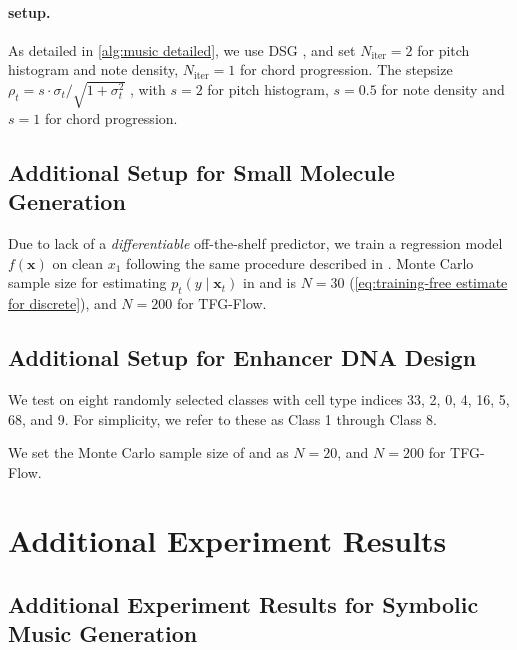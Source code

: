 \paragraph{\xcleansampling setup.}
As detailed in \cref{alg:music detailed}, we  use DSG \cite{yang2024guidance}, and set $N_{\text{iter}} = 2$ for pitch histogram and note density, $N_{\text{iter}} = 1$ for chord progression. The stepsize $\rho_t = s \cdot \sigma_t / \sqrt{1+\sigma_t^2} $ \citep{song2023loss,ye2024tfg}, with $s = 2$ for pitch histogram, $s=0.5$ for note density and $s=1$ for chord progression.




















\subsection{Additional Setup for Small Molecule Generation}\label{app:molecule setup}
Due to lack of a \textit{differentiable} off-the-shelf predictor, we train a regression model $f(\boldsymbol{x})$ on clean $x_1$ following the same procedure described in \citet{nisonoff2024unlocking}. Monte Carlo sample size for estimating $p_t(y\mid \boldsymbol{x}_t)$ in \xtgrad and \xtsampling is $N=30$ (\cref{eq:training-free estimate for discrete}), and $N=200$ for TFG-Flow.


\subsection{Additional Setup for Enhancer DNA Design}
We test on eight randomly selected classes with cell type indices 33, 2, 0, 4, 16, 5, 68, and 9. For simplicity, we refer to these as Class 1 through Class 8.


We set the Monte Carlo sample size of \xtgrad and \xtsampling as $N=20$, and $N=200$ for TFG-Flow.


\section{Additional Experiment Results} \label{app:additional res}

\subsection{Additional Experiment Results for Symbolic Music Generation}\label{app:additional music}

